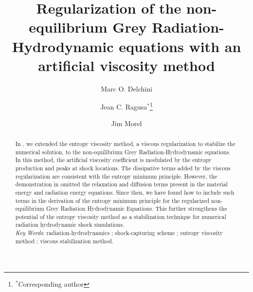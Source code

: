 \documentclass[review]{elsarticle}
\begin{document}
%
\begin{frontmatter}
%
\title{Regularization of the non-equilibrium Grey Radiation-Hydrodynamic equations with an artificial viscosity method}
\author{Marc O. Delchini}
%
\author{Jean C. Ragusa$^*$\footnote{$^*$Corresponding author}}
%
\author{Jim Morel}

\address[label1]{Department of Nuclear Engineering, Texas A\&M University, College Station, TX 77843, USA }
\begin{abstract}
In \cite{our_jcp_radhy_paper}, we extended the entropy viscosity method, a viscous regularization to stabilize the numerical solution, 
to the non-equilibrium Grey Radiation-Hydrodynamic equations. 
In this method, the artificial viscosity coefficient is modulated by the entropy production and peaks at shock locations. 
The dissipative terms added by the viscous regularization are consistent with the entropy minimum principle. 
However, the demonstration in \cite{our_jcp_radhy_paper} omitted the relaxation and diffusion terms 
present in the material energy and radiation energy equations. Since then, we have found how to include such terms 
in the derivation of the entropy minimum principle for the regularized non-equilibrium Grey Radiation Hydrodynamic Equations. 
This further strengthens the potential of the entropy viscosity method as a stabilization technique for numerical radiation 
hydrodynamic shock simulations.\\
%
\emph{Key Words}: radiation-hydrodynamics ; shock-capturing scheme ; entropy viscosity method ; viscous stabilization method.
\end{abstract}
%
\end{frontmatter}
%
\linenumbers
\end{document}
